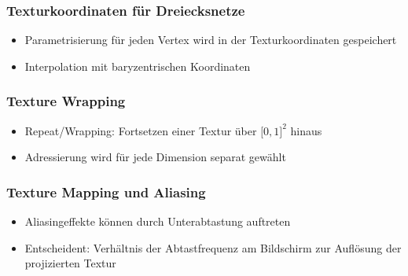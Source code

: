 \subsubsection{Texturkoordinaten für Dreiecksnetze}
\begin{itemize}
	\item Parametrisierung für jeden Vertex wird in der Texturkoordinaten gespeichert
	\item Interpolation mit baryzentrischen Koordinaten
\end{itemize}

\subsubsection{Texture Wrapping}
\begin{itemize}
	\item Repeat/Wrapping: Fortsetzen einer Textur über \(\lbrack 0,1 \rbrack^2\) hinaus
	\item Adressierung wird für jede Dimension separat gewählt
\end{itemize}

\subsubsection{Texture Mapping und Aliasing}
\begin{itemize}
	\item Aliasingeffekte können durch Unterabtastung auftreten
	\item Entscheident: Verhältnis der Abtastfrequenz am Bildschirm zur Auflösung der projizierten Textur
\end{itemize}

